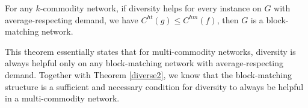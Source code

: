 \begin{theorem}
For any $k$-commodity network, if diversity helps for every instance on $G$ with average-respecting demand, we have $C^{ht}(g)\le C^{hm}(f)$, then $G$ is a block-matching network.
\end{theorem}

\begin{proof-sketch}

This theorem essentially states that for multi-commodity networks, diversity is always helpful only on any block-matching network with average-respecting demand. Together with Theorem \ref{diverse2}, we know that the block-matching structure is a sufficient and necessary condition for diversity to always be helpful in a multi-commodity network.
\end{proof-sketch}

